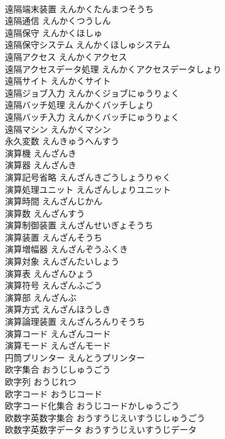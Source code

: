 \documentclass[8pt]{extreport}
\begin{document}
\begin{CJK}{UTF8}{min}
\\	遠隔端末装置	えんかくたんまつそうち	
\\	遠隔通信	えんかくつうしん	
\\	遠隔保守	えんかくほしゅ	
\\	遠隔保守システム	えんかくほしゅシステム	
\\	遠隔アクセス	えんかくアクセス	
\\	遠隔アクセスデータ処理	えんかくアクセスデータしょり	
\\	遠隔サイト	えんかくサイト	
\\	遠隔ジョブ入力	えんかくジョブにゅうりょく	
\\	遠隔バッチ処理	えんかくバッチしょり	
\\	遠隔バッチ入力	えんかくバッチにゅうりょく	
\\	遠隔マシン	えんかくマシン	
\\	永久変数	えんきゅうへんすう	
\\	演算機	えんざんき	
\\	演算器	えんざんき	
\\	演算記号省略	えんざんきごうしょうりゃく	
\\	演算処理ユニット	えんざんしょりユニット	
\\	演算時間	えんざんじかん	
\\	演算数	えんざんすう	
\\	演算制御装置	えんざんせいぎょそうち	
\\	演算装置	えんざんそうち	
\\	演算増幅器	えんざんぞうふくき	
\\	演算対象	えんざんたいしょう	
\\	演算表	えんざんひょう	
\\	演算符号	えんざんふごう	
\\	演算部	えんざんぶ	
\\	演算方式	えんざんほうしき	
\\	演算論理装置	えんざんろんりそうち	
\\	演算コード	えんざんコード	
\\	演算モード	えんざんモード	
\\	円筒プリンター	えんとうプリンター	
\\	欧字集合	おうじしゅうごう	
\\	欧字列	おうじれつ	
\\	欧字コード	おうじコード	
\\	欧字コード化集合	おうじコードかしゅうごう	
\\	欧数字英数字集合	おうすうじえいすうじしゅうごう	
\\	欧数字英数字データ	おうすうじえいすうじデータ	

\end{CJK}
\end{document}
